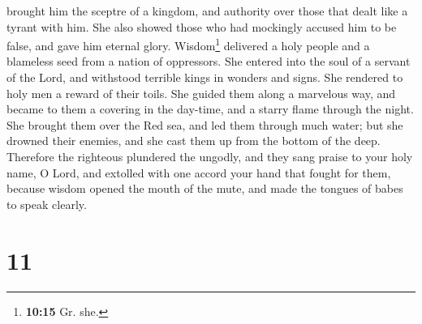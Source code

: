 brought him the sceptre of a kingdom, and authority over those that
dealt like a tyrant with him. She also showed those who had mockingly
accused him to be false, and gave him eternal glory. 
Wisdom\footnote{\textbf{10:15} Gr. she.} delivered a holy people and a
blameless seed from a nation of oppressors.  She entered
into the soul of a servant of the Lord, and withstood terrible kings in
wonders and signs.  She rendered to holy men a reward of
their toils. She guided them along a marvelous way, and became to them a
covering in the day-time, and a starry flame through the night.
 She brought them over the Red sea, and led them through
much water;  but she drowned their enemies, and she cast
them up from the bottom of the deep.  Therefore the
righteous plundered the ungodly, and they sang praise to your holy name,
O Lord, and extolled with one accord your hand that fought for them,
 because wisdom opened the mouth of the mute, and made
the tongues of babes to speak clearly.

\hypertarget{section-10}{%
\section{11}\label{section-10}}


